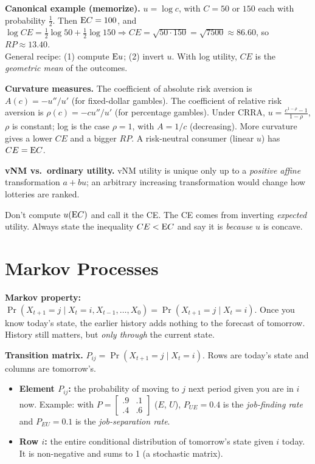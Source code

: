 \documentclass[10pt]{article}
\begin{document}
\textbf{Canonical example (memorize).} $u=\log c$, with $C=50$ or $150$ each with probability $\tfrac12$. Then $\mathrm{E} C=100$, and
$\log CE=\tfrac12\log50+\tfrac12\log150\Rightarrow CE=\sqrt{50\cdot150}=\sqrt{7500}\approx\mathbf{86.60}$, so $RP\approx13.40$.\\
General recipe: (1) compute $\mathrm{E} u$; (2) invert $u$. With log utility, $CE$ is the \emph{geometric mean} of the outcomes.

\textbf{Curvature measures.} The coefficient of absolute risk aversion is $A(c)=-u''/u'$ (for fixed-dollar gambles). The coefficient of relative risk aversion is $\rho(c)=-cu''/u'$ (for percentage gambles). Under CRRA, $u=\frac{c^{1-\rho}-1}{1-\rho}$, $\rho$ is constant; log is the case $\rho=1$, with $A=1/c$ (decreasing). More curvature gives a lower $CE$ and a bigger $RP$. A risk-neutral consumer (linear $u$) has $CE=\mathrm{E} C$.

\textbf{vNM vs.\ ordinary utility.} vNM utility is unique only up to a \emph{positive affine} transformation $a+bu$; an arbitrary increasing transformation would change how lotteries are ranked.

\begin{trap}
\small Don't compute $u(\mathrm{E} C)$ and call it the CE. The CE comes from inverting \emph{expected} utility. Always state the inequality $CE<\mathrm{E} C$ and say it is \emph{because} $u$ is concave.
\end{trap}

\section{Markov Processes}

\begin{bigidea}
\textbf{Markov property:} $\Pr(X_{t+1}=j\mid X_t=i,X_{t-1},\dots,X_0)=\Pr(X_{t+1}=j\mid X_t=i)$. Once you know today's state, the earlier history adds nothing to the forecast of tomorrow. History still matters, but \emph{only through} the current state.
\end{bigidea}

\begin{minipage}{0.55\textwidth}
\textbf{Transition matrix.} $P_{ij}=\Pr(X_{t+1}=j\mid X_t=i)$. Rows are today's state and columns are tomorrow's.
\begin{itemize}
\item \textbf{Element $P_{ij}$:} the probability of moving to $j$ next period given you are in $i$ now. Example: with $P=\begin{bmatrix}.9&.1\\.4&.6\end{bmatrix}$ ($E$, $U$), $P_{UE}=0.4$ is the \emph{job-finding rate} and $P_{EU}=0.1$ is the \emph{job-separation rate}.
\item \textbf{Row $i$:} the entire conditional distribution of tomorrow's state given $i$ today. It is non-negative and sums to 1 (a stochastic matrix).
\end{itemize}
\end{minipage}\hfill
\begin{minipage}{0.42\textwidth}\centering
\figMarkov
\end{minipage}
\end{document}
